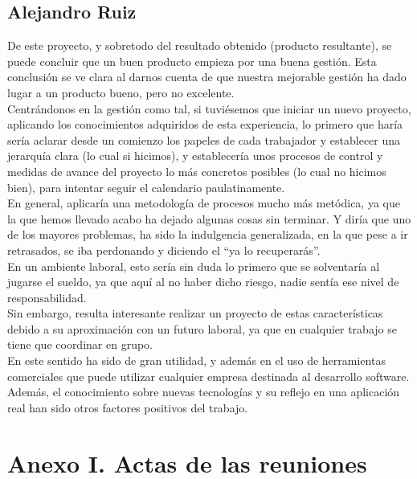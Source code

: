 \documentclass{article}
\begin{document}
\subsection*{Alejandro Ruiz}
De este proyecto, y sobretodo del resultado obtenido (producto resultante), se puede concluir que un buen producto empieza por una buena gestión. Esta conclusión se ve clara al darnos cuenta de que nuestra mejorable gestión ha dado lugar a un producto bueno, pero no excelente. \\
\hfill \break
Centrándonos en la gestión como tal, si tuviésemos que iniciar un nuevo proyecto, aplicando los conocimientos adquiridos de esta experiencia, lo primero que haría sería aclarar desde un comienzo los papeles de cada trabajador y establecer una jerarquía clara (lo cual si hicimos), y establecería unos procesos de control y medidas de avance del proyecto lo más concretos posibles (lo cual no hicimos bien), para intentar seguir el calendario paulatinamente. \\
\hfill \break
En general, aplicaría una metodología de procesos mucho más metódica, ya que la que hemos llevado acabo ha dejado algunas cosas sin terminar. 
Y diría que uno de los mayores problemas, ha sido la indulgencia generalizada, en la que pese a ir retrasados, se iba perdonando y diciendo el “ya lo recuperarás”. \\
En un ambiente laboral, esto sería sin duda lo primero que se solventaría al jugarse el sueldo, ya que aquí al no haber dicho riesgo, nadie sentía ese nivel de responsabilidad. \\
\hfill \break
Sin embargo, resulta interesante realizar un proyecto de estas características debido a su aproximación con un futuro laboral, ya que en cualquier trabajo se tiene que coordinar en grupo. \\
En este sentido ha sido de gran utilidad, y además en el uso de herramientas comerciales que puede utilizar cualquier empresa destinada al desarrollo software. \\
\hfill \break
Además, el conocimiento sobre nuevas tecnologías y su reflejo en una aplicación real han sido otros factores positivos del trabajo.
\newpage
\section*{Anexo I. Actas de las reuniones}

\newpage
\end{document}
